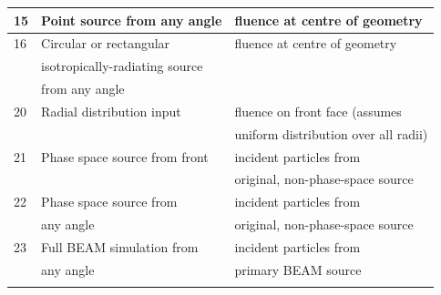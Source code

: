\documentclass[12pt,twoside]{article}  %
\begin{document}
\begin{latexonly}
\begin{longtable}{lll}
\hline
15 & Point source from any angle & fluence at centre of geometry\\
\hline
16 & Circular or rectangular & fluence at centre of geometry\\
   & isotropically-radiating source & \\
   & from any angle  &\\
\hline
20 & Radial distribution input & fluence on front face (assumes\\
   &                           & uniform distribution over all radii)\\
\hline
21 & Phase space source from front & incident particles from\\
   &                               & original, non-phase-space source\\
\hline
22 & Phase space source from   & incident particles from\\
   & any angle  & original, non-phase-space source\\
\hline
23 & Full BEAM simulation from   & incident particles from\\
   & any angle  & primary BEAM source\\
\label{normtable}
\end{longtable}
\end{latexonly}
\end{document}
